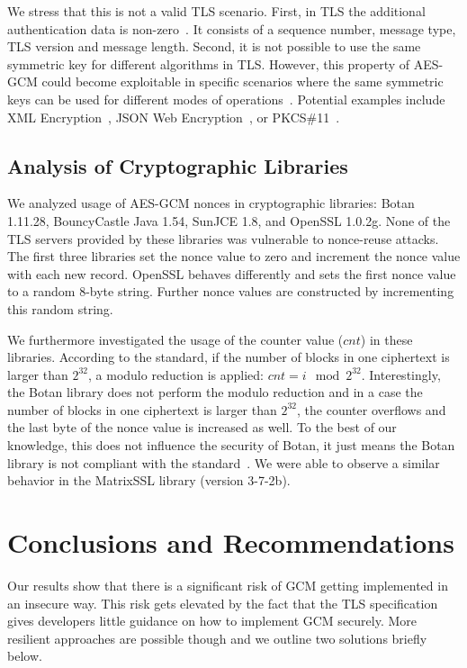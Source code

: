 \documentclass[10pt, a4paper]{article}
\begin{document}
We stress that this is not a valid TLS scenario. First, in TLS the additional authentication data is non-zero~\cite{rfc5246}. It consists of a sequence number, message type, TLS version and message length.
Second, it is not possible to use the same symmetric key for different algorithms in TLS.
However, this property of AES-GCM could become exploitable in specific scenarios where the same symmetric keys can be used for different modes of operations~\cite{jager13one}.
Potential examples include XML Encryption~\cite{Eastlake2012},
JSON Web Encryption~\cite{rfc7516}, or PKCS\#11~\cite{Griffin2014}.


\subsection{Analysis of Cryptographic Libraries}
We analyzed usage of AES-GCM nonces in cryptographic libraries: Botan 1.11.28, BouncyCastle Java 1.54, SunJCE 1.8, and OpenSSL 1.0.2g.
None of the TLS servers provided by these libraries was vulnerable to nonce-reuse attacks. The first three libraries set the nonce value to zero
and increment the nonce value with each new record. OpenSSL behaves differently and sets the first nonce value to a random
8-byte string. Further nonce values are constructed by incrementing this random string.

We furthermore investigated the usage of the counter value ($cnt$) in these libraries. According to the standard,
if the number of blocks in one ciphertext is larger than $2^{32}$, a modulo reduction is applied: $cnt = i \mod{2^{32}}$.
Interestingly, the Botan library does not perform the modulo reduction and in a case the number of blocks in one ciphertext
is larger than $2^{32}$, the counter overflows and the last byte of the nonce value is increased as well. To the best of our knowledge,
this does not influence the security of Botan, it just means the Botan library is not compliant with the standard~\cite{gcm}.
We were able to observe a similar behavior in the MatrixSSL library (version 3-7-2b).

\section{Conclusions and Recommendations}
Our results show that there is a significant risk of GCM getting implemented in an insecure way. This risk gets elevated by the fact that the TLS specification
gives developers little guidance on how to implement GCM securely. More resilient approaches are possible though and we outline two solutions briefly below.
\end{document}
